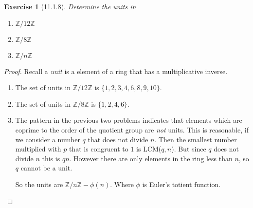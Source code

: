 \documentclass[12pt]{article}
\newtheorem*{exer}{Exercise}
\begin{document}

\begin{exer}[11.1.8]

    Determine the units in

    \begin{enumerate}
        \item $\mathbb{Z}/12\mathbb{Z}$
        \item $\mathbb{Z}/8\mathbb{Z}$
        \item $\mathbb{Z}/n\mathbb{Z}$
    \end{enumerate}

\end{exer}

\begin{proof}

    Recall a \textit{unit} is a element of a ring that has a
    multiplicative inverse.

    \begin{enumerate}
        \item The set of units in $\mathbb{Z}/12\mathbb{Z}$ is $\{1, 2,
            3, 4, 6, 8, 9, 10\}$.

        \item The set of units in $\mathbb{Z}/8\mathbb{Z}$ is $\{1, 2,
            4, 6\}$.

        \item The pattern in the previous two problems indicates that
            elements which are coprime to the order of the quotient
            group are \textit{not} units. This is reasonable, if we
            consider a number $q$ that does not divide $n$. Then the
            smallest number multiplied with $p$ that is congruent to $1$
            is LCM($q,n$). But since $q$ does not divide $n$ this is
            $qn$.  However there are only elements in the ring less than
            $n$, so $q$ cannot be a unit.

            So the units are $\mathbb{Z}/n\mathbb{Z} - \phi(n)$. Where
            $\phi$ is Euler's totient function.

    \end{enumerate}
\end{proof}
\end{document}
